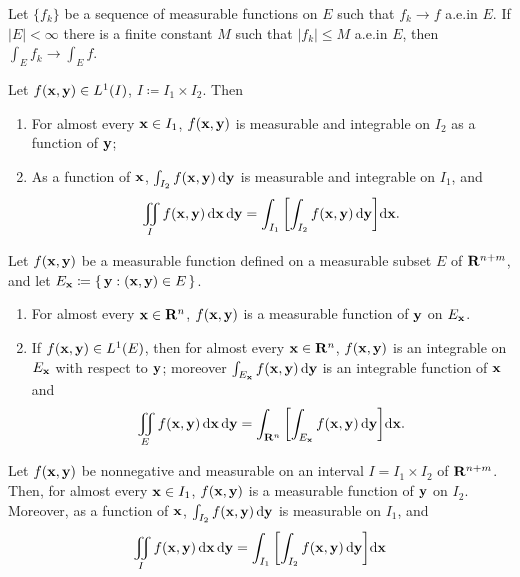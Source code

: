 \begin{corollary*}
Let $\{f_k\}$ be a sequence of measurable functions on $E$ such  that
$f_k\to f$ a.e.\@ in $E$. If $|E|<\infty$ there is a finite constant $M$
such that $|f_k|\leq M$ a.e.\@ in $E$, then $\int_E f_k\to\int_E f$.
\end{corollary*}
\begin{theorem*}
Let $f(\mathbf{x},\mathbf{y})\in L^1(I)$, $I\coloneqq I_1\times I_2$. Then
\begin{enumerate}[label=\textnormal{(\roman*)}]
\item For almost every $\mathbf{x}\in I_1$, $f(\mathbf{x},\mathbf{y})$ is measurable and
  integrable on $I_2$ as a function of $\mathbf{y}$;
\item As a function of $\mathbf{x}$, $\int_{I_2} f(\mathbf{x},\mathbf{y})\mathop{}\!\mathrm{d}\mathbf{y}$ is
  measurable and integrable on $I_1$, and
\[
\iint_I f(\mathbf{x},\mathbf{y})\mathop{}\!\mathrm{d}\mathbf{x}\mathop{}\!\mathrm{d}\mathbf{y}=
\int_{I_1}\left[\int_{I_2}f(\mathbf{x},\mathbf{y})\mathop{}\!\mathrm{d}\mathbf{y}\right]\!\mathop{}\!\mathrm{d}\mathbf{x}.
\]
\end{enumerate}
\end{theorem*}
\begin{theorem*}[6.8]
Let $f(\mathbf{x},\mathbf{y})$ be a measurable function defined on a measurable subset
$E$ of $\mathbf{R}^{n+m}$, and let $E_{\mathbf{x}}\coloneqq\left\{ \,\mathbf{y}:(\mathbf{x},\mathbf{y})\in
  E \,\right\}$.
\begin{enumerate}[label=\textnormal{(\roman*)}]
\item For almost every $\mathbf{x}\in \mathbf{R}^n$, $f(\mathbf{x},\mathbf{y})$ is a measurable
  function of $\mathbf{y}$ on $E_{\mathbf{x}}$.
\item If $f(\mathbf{x},\mathbf{y})\in L^1(E)$, then for almost every $\mathbf{x}\in\mathbf{R}^n$,
  $f(\mathbf{x},\mathbf{y})$ is an integrable on $E_{\mathbf{x}}$ with respect to $\mathbf{y}$;
  moreover $\int_{E_{\mathbf{x}}}f(\mathbf{x},\mathbf{y})\mathop{}\!\mathrm{d}\mathbf{y}$ is an integrable function
  of $\mathbf{x}$ and
\[
\iint_E f(\mathbf{x},\mathbf{y})\mathop{}\!\mathrm{d}\mathbf{x}\mathop{}\!\mathrm{d}\mathbf{y}=\int_{\mathbf{R}^n}\left[\int_{E_{\mathbf{x}}}f(\mathbf{x},\mathbf{y})\mathop{}\!\mathrm{d}\mathbf{y}\right]\!\mathop{}\!\mathrm{d}\mathbf{x}.
\]
\end{enumerate}
\end{theorem*}
\begin{theorem*}
Let $f(\mathbf{x},\mathbf{y})$ be nonnegative and measurable on an interval
$I=I_1\times I_2$ of $\mathbf{R}^{n+m}$. Then, for almost every $\mathbf{x}\in I_1$,
$f(\mathbf{x},\mathbf{y})$ is a measurable function of $\mathbf{y}$ on $I_2$. Moreover, as a
function of $\mathbf{x}$, $\int_{I_2}f(\mathbf{x},\mathbf{y})\mathop{}\!\mathrm{d} \mathbf{y}$ is measurable on
$I_1$, and
\[
\iint_I f(\mathbf{x},\mathbf{y})\mathop{}\!\mathrm{d}\mathbf{x}\mathop{}\!\mathrm{d}\mathbf{y}=\int_{I_1}\left[\int_{I_2}f(\mathbf{x},\mathbf{y})\mathop{}\!\mathrm{d}\mathbf{y}\right]\!\mathop{}\!\mathrm{d}\mathbf{x}
\]
\end{theorem*}
